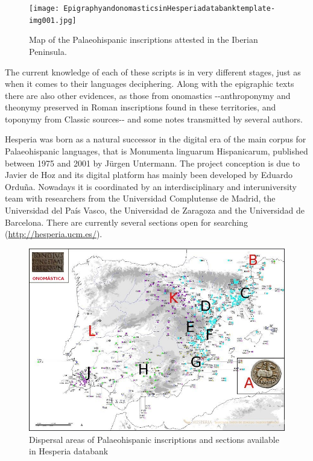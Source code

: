 \documentclass[amsthm,ebook]{saparticle}
\begin{document}
\begin{figure}[!bp]
\centering
 \texttt{[image: EpigraphyandonomasticsinHesperiadatabanktemplate-img001.jpg]}
\caption{ Map of the Palaeohispanic inscriptions attested in the Iberian Peninsula.}
\label{fig:1}
\end{figure}


The current knowledge of each of these scripts is in very different stages, just as when it comes to their languages
deciphering. Along with the epigraphic texts there are also other evidences, as those from onomastics -{}-anthroponymy
and theonymy preserved in Roman inscriptions found in these territories, and toponymy from Classic sources-{}- and some
notes transmitted by several authors. 

Hesperia was born as a natural successor in the digital era of the main corpus for Palaeohispanic languages, that is
Monumenta linguarum Hispanicarum, published between 1975 and 2001 by Jürgen Untermann. The project conception is due to
Javier de Hoz and its digital platform has mainly been developed by Eduardo Orduña. Nowadays it is coordinated by an
interdisciplinary and interuniversity team with researchers from the Universidad Complutense de Madrid, the Universidad
del País Vasco, the Universidad de Zaragoza and the Universidad de Barcelona. There are currently several sections open
for searching (\url{http://hesperia.ucm.es/}).

\begin{figure}[!bp]
\centering
 \includegraphics[width=\columnwidth]{EpigraphyandonomasticsinHesperiadatabanktemplate-img002.png}
\caption{Dispersal areas of Palaeohispanic inscriptions and sections available in Hesperia databank}
\label{fig:2}
\end{figure}
\end{document}
